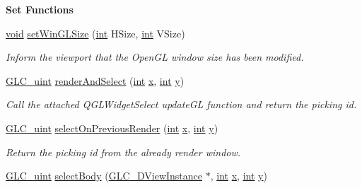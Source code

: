 \begin{Indent}{\bf Set Functions}\par
\begin{DoxyCompactItemize}
\item 
\hyperlink{group___u_a_v_objects_plugin_ga444cf2ff3f0ecbe028adce838d373f5c}{void} \hyperlink{class_g_l_c___viewport_a7921b0d06274dd419061733438644a12}{set\-Win\-G\-L\-Size} (\hyperlink{ioapi_8h_a787fa3cf048117ba7123753c1e74fcd6}{int} H\-Size, \hyperlink{ioapi_8h_a787fa3cf048117ba7123753c1e74fcd6}{int} V\-Size)
\begin{DoxyCompactList}\small\item\em Inform the viewport that the Open\-G\-L window size has been modified. \end{DoxyCompactList}\item 
\hyperlink{glc__global_8h_abf950976fabed69026558df8e2da6c6b}{G\-L\-C\-\_\-uint} \hyperlink{class_g_l_c___viewport_a00233ef1df5a937ceb25ce7cb840e743}{render\-And\-Select} (\hyperlink{ioapi_8h_a787fa3cf048117ba7123753c1e74fcd6}{int} \hyperlink{glext_8h_a1db9d104e3c2128177f26aff7b46982f}{x}, \hyperlink{ioapi_8h_a787fa3cf048117ba7123753c1e74fcd6}{int} \hyperlink{glext_8h_a42315f3ed8fff752bb47fd782309fcfc}{y})
\begin{DoxyCompactList}\small\item\em Call the attached Q\-G\-L\-Widget\-Select update\-G\-L function and return the picking id. \end{DoxyCompactList}\item 
\hyperlink{glc__global_8h_abf950976fabed69026558df8e2da6c6b}{G\-L\-C\-\_\-uint} \hyperlink{class_g_l_c___viewport_a67c231c78f4ab5207b24ca1c90aad074}{select\-On\-Previous\-Render} (\hyperlink{ioapi_8h_a787fa3cf048117ba7123753c1e74fcd6}{int} \hyperlink{glext_8h_a1db9d104e3c2128177f26aff7b46982f}{x}, \hyperlink{ioapi_8h_a787fa3cf048117ba7123753c1e74fcd6}{int} \hyperlink{glext_8h_a42315f3ed8fff752bb47fd782309fcfc}{y})
\begin{DoxyCompactList}\small\item\em Return the picking id from the already render window. \end{DoxyCompactList}\item 
\hyperlink{glc__global_8h_abf950976fabed69026558df8e2da6c6b}{G\-L\-C\-\_\-uint} \hyperlink{class_g_l_c___viewport_a8d058b4333e076161080905101c487d1}{select\-Body} (\hyperlink{class_g_l_c__3_d_view_instance}{G\-L\-C\-\_\-D\-View\-Instance} $\ast$, \hyperlink{ioapi_8h_a787fa3cf048117ba7123753c1e74fcd6}{int} \hyperlink{glext_8h_a1db9d104e3c2128177f26aff7b46982f}{x}, \hyperlink{ioapi_8h_a787fa3cf048117ba7123753c1e74fcd6}{int} \hyperlink{glext_8h_a42315f3ed8fff752bb47fd782309fcfc}{y})

\end{DoxyCompactItemize}
\end{Indent}
